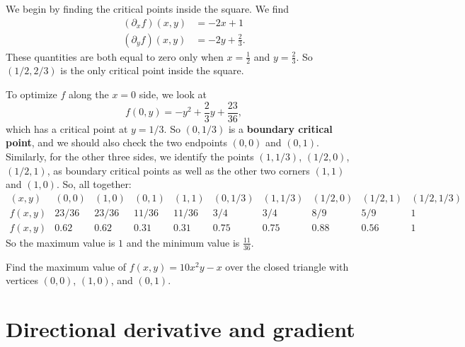 \documentclass[svgnames]{report}
\begin{document}
  \begin{solution}
    We begin by finding the critical points inside the square. We find
    \begin{align*}
      (\partial_xf)(x,y) &= -2x + 1  \\
      (\partial_yf)(x,y) &= -2y + \frac{2}{3}. 
    \end{align*}
    These quantities are both equal to zero only when $x =
    \tfrac{1}{2}$ and $y = \frac{2}{3}$. So $(1/2,2/3)$ is the only critical
    point inside the square.

    To optimize $f$ along the $x = 0$ side, we look at
    \[
      f(0,y) = -y^2 + \frac{2}{3}y + \frac{23}{36}, 
    \]
    which has a critical point at $y = 1/3$. So $(0,1/3)$ is a
    \textbf{boundary critical point}, and we should also check the two
    endpoints $(0,0)$ and $(0,1)$. Similarly, for the other three
    sides, we identify the points $(1,1/3)$, $(1/2,0)$, $(1/2,1)$, as
    boundary critical points as well as the other two corners $(1,1)$
    and $(1,0)$. So, all together:
    \[
      \renewcommand\arraystretch{1.4}
      \begin{array}{c|ccccccccc}
       (x,y) &  (0,0) & (1,0) & (0,1) & (1,1) & (0,1/3) & (1,1/3) & (1/2,0) &
                                                                      (1/2,1)
        & (1/2,1/3) \\ \hline
        f(x,y) & 23/36 & 23/36 & 11/36 & 11/36 & 3/4 & 3/4 & 8/9 & 5/9
        & 1 \\
        f(x,y) & 0.62 & 0.62 & 0.31 & 0.31 & 0.75 & 0.75 & 0.88 & 0.56
        & 1
      \end{array}
    \]
    So the maximum value is $\boxed{1}$ and the minimum value is
    $\boxed{\tfrac{11}{36}}$. 
  \end{solution}

  \begin{exercise}{}{}
    Find the maximum value of $f(x,y) = 10x^2y-x$ over the closed
    triangle with vertices $(0,0)$, $(1,0)$, and $(0,1)$.
  \end{exercise}
  
  \section{Directional derivative and gradient}

\end{document}
